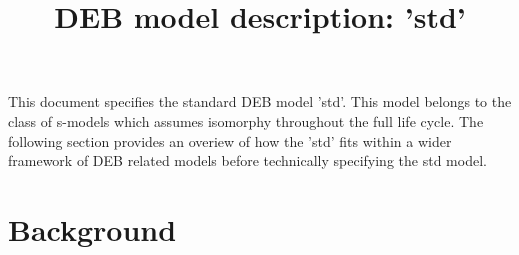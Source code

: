 \documentclass{article}
\title{DEB model description: 'std'}
\begin{document}
\maketitle

This document specifies the standard DEB model 'std'.
This model belongs to the class of s-models which assumes isomorphy throughout the full life cycle.
The following section provides an overiew of how the 'std' fits within a wider framework of DEB related models before technically specifying the std model.

\section{Background}







\end{document}
